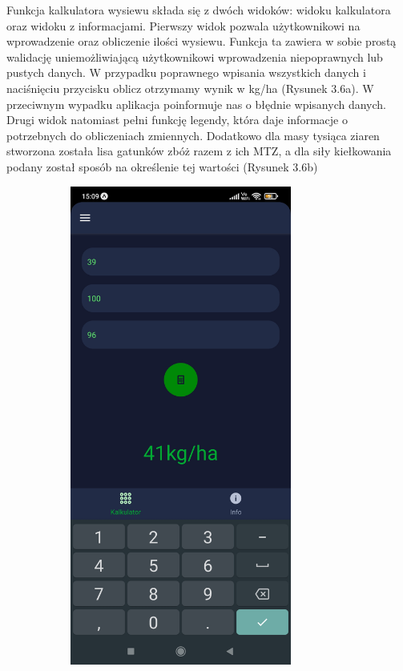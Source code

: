 \documentclass[a4paper,12pt,oneside]{book}
\begin{document}
	Funkcja kalkulatora wysiewu składa się z dwóch widoków: widoku kalkulatora oraz widoku z informacjami. Pierwszy widok pozwala użytkownikowi na wprowadzenie oraz obliczenie ilości wysiewu. Funkcja ta zawiera w sobie prostą walidację uniemożliwiającą użytkownikowi wprowadzenia niepoprawnych lub pustych danych. W przypadku poprawnego wpisania wszystkich danych i naciśnięciu przycisku oblicz otrzymamy wynik w kg/ha (Rysunek 3.6a). W przeciwnym wypadku aplikacja poinformuje nas o błędnie wpisanych danych.  Drugi widok natomiast pełni funkcję legendy, która daje informacje o potrzebnych do obliczeniach zmiennych. Dodatkowo dla masy tysiąca ziaren stworzona została lisa gatunków zbóż razem z ich MTZ, a dla siły kiełkowania podany został sposób na określenie tej wartości (Rysunek 3.6b)
	
	\begin{figure}[H]
		\centering
		\begin{subfigure}{.5\textwidth}
			\centering
			\includegraphics[width=0.8\textwidth]{grafika/kal_a.jpg}

\end{subfigure}
\end{figure}
\end{document}
